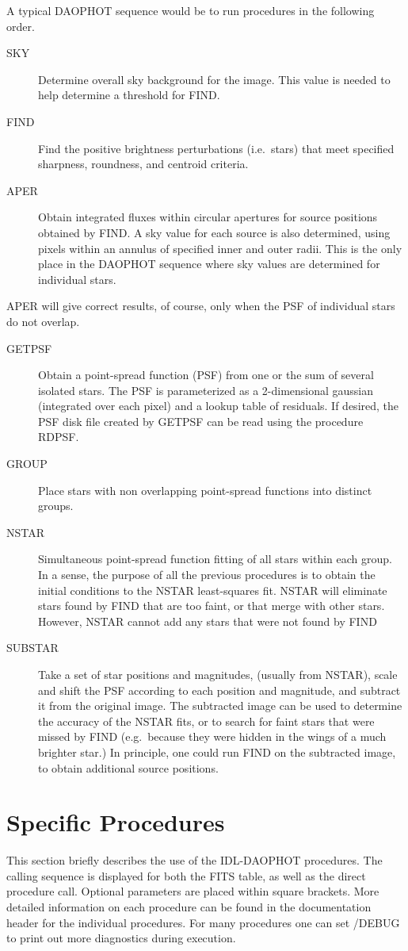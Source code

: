 A typical DAOPHOT sequence would be to run procedures in the following
order.
\begin{description}
\item[SKY] Determine overall sky background for the image.  This value is
needed to help determine a threshold for FIND.
\item[FIND] Find the positive brightness perturbations (i.e.\ stars) that
meet specified sharpness, roundness, and centroid criteria.
\item[APER] Obtain integrated fluxes within circular apertures for source
positions obtained by FIND.  A sky value for each source is also determined,
using pixels within an annulus of specified inner and outer radii.  This
is the only place in the DAOPHOT sequence where sky values are
determined for individual stars.
\end{description}
APER will give correct results, of course, only when the PSF of individual
stars do not overlap.
\begin{description}
\item[GETPSF]  Obtain a point-spread function (PSF) from one or the sum of
several isolated stars.   The PSF is parameterized as a 2-dimensional
gaussian (integrated over each pixel) and a lookup table of residuals.
If desired, the PSF disk file created by GETPSF can be read using the
procedure RDPSF.
\item[GROUP]  Place stars with non overlapping point-spread functions
into distinct groups.
\item[NSTAR]  Simultaneous point-spread function fitting of all stars 
within each group.   In a sense, the purpose of all the previous 
procedures is to obtain the initial conditions to the NSTAR least-squares
fit.   NSTAR will eliminate stars found by FIND that are too faint, or
that merge with other stars.  However, NSTAR cannot add any stars that
were not found by FIND
\item[SUBSTAR]  Take a set of star positions and magnitudes, (usually from
NSTAR), scale and shift the PSF according to each position and magnitude,
and subtract it from the original image.  The subtracted image can be
used to determine the accuracy of the NSTAR fits, or to search for faint
stars that were missed by FIND (e.g.\ because they were hidden in the wings
of a much brighter star.)  In principle, one could run FIND on the subtracted
image, to obtain additional source positions.
\end{description}
\section{Specific Procedures}
This section briefly describes the use of the IDL-DAOPHOT procedures.
The calling sequence is displayed for both the FITS table, as well as
the direct procedure call.  
Optional parameters are placed within square brackets.  
More detailed information on each procedure can be found in the 
documentation header for the individual procedures.   
For many procedures one can set /DEBUG to print out more diagnostics during
execution.

